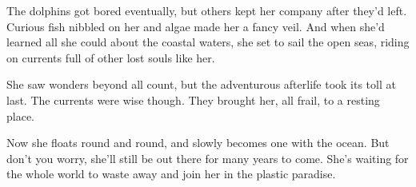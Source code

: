 The dolphins got bored eventually, but others kept her company after they'd left. Curious fish nibbled on her and algae made her a fancy veil. And when she'd learned all she could about the coastal waters, she set to sail the open seas, riding on currents full of other lost souls like her.

She saw wonders beyond all count, but the adventurous afterlife took its toll at last. The currents were wise though. They brought her, all frail, to a resting place.

Now she floats round and round, and slowly becomes one with the ocean. But don't you worry, she'll still be out there for many years to come. She's waiting for the whole world to waste away and join her in the plastic paradise.
